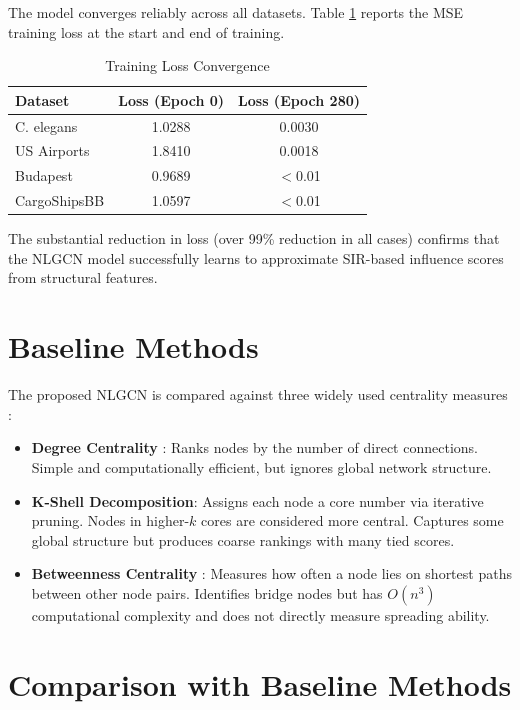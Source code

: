 The model converges reliably across all datasets. Table
\ref{tab:convergence} reports the MSE training loss at the start and
end of training.

\begin{table}[h]
\centering
\caption{Training Loss Convergence}
\label{tab:convergence}
\begin{tabular}{|l|c|c|}
\hline
\textbf{Dataset} & \textbf{Loss (Epoch 0)} &
\textbf{Loss (Epoch 280)} \\
\hline
C. elegans   & 1.0288 & 0.0030 \\
US Airports  & 1.8410 & 0.0018 \\
Budapest     & 0.9689 & $<$0.01 \\
CargoShipsBB & 1.0597 & $<$0.01 \\
\hline
\end{tabular}
\end{table}

The substantial reduction in loss (over 99\% reduction in all cases)
confirms that the NLGCN model successfully learns to approximate
SIR-based influence scores from structural features.

\section{Baseline Methods}

The proposed NLGCN is compared against three widely used centrality
measures \cite{mukhtar, farooq2018}:

\begin{itemize}
    \item \textbf{Degree Centrality} : Ranks
    nodes by the number of direct connections. Simple and
    computationally efficient, but ignores global network structure.

    \item \textbf{K-Shell Decomposition}: Assigns each
    node a core number via iterative pruning. Nodes in higher-$k$
    cores are considered more central. Captures some global structure
    but produces coarse rankings with many tied scores.

    \item \textbf{Betweenness Centrality} :
    Measures how often a node lies on shortest paths between other node
    pairs. Identifies bridge nodes but has $O(n^3)$ computational
    complexity and does not directly measure spreading ability.
\end{itemize}

\section{Comparison with Baseline Methods}

